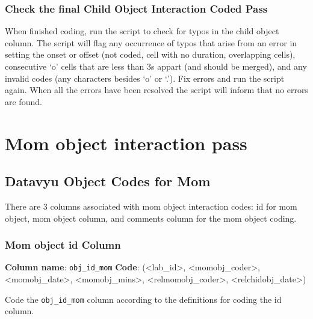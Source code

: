 \documentclass[
]{book}
\begin{document}
\hypertarget{check-the-final-child-object-interaction-coded-pass}{%
\subsubsection*{Check the final Child Object Interaction Coded Pass}\label{check-the-final-child-object-interaction-coded-pass}}

When finished coding, run the script to check for typos in the child object column. The script will flag any occurrence of typos that arise from an error in setting the onset or offset (not coded, cell with no duration, overlapping cells), consecutive `o' cells that are less than 3s appart (and should be merged), and any invalid codes (any characters besides `o' or `.'). Fix errors and run the script again. When all the errors have been resolved the script will inform that no errors are found.

\hypertarget{mom-object-interaction-pass}{%
\section{Mom object interaction pass}\label{mom-object-interaction-pass}}

\hypertarget{datavyu-object-codes-for-mom}{%
\subsection{Datavyu Object Codes for Mom}\label{datavyu-object-codes-for-mom}}

There are 3 columns associated with mom object interaction codes: id for mom object, mom object column, and comments column for the mom object coding.

\hypertarget{mom-object-id-column}{%
\subsubsection*{Mom object id Column}\label{mom-object-id-column}}

\textbf{Column name}: \texttt{obj\_id\_mom}
\textbf{Code}: (\textless lab\_id\textgreater, \textless momobj\_coder\textgreater, \textless momobj\_date\textgreater, \textless momobj\_mins\textgreater, \textless relmomobj\_coder\textgreater, \textless relchidobj\_date\textgreater)

Code the \texttt{obj\_id\_mom} column according to the definitions for coding the id column.
\end{document}

